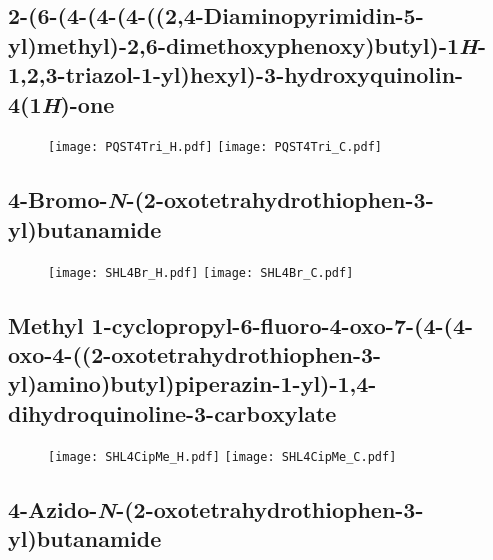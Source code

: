 \subsection{2-(6-(4-(4-(4-((2,4-Diaminopyrimidin-5-yl)methyl)-2,6-dimethoxyphenoxy)bu\allowbreak tyl)-1\textit{H}-1,2,3-triazol-1-yl)hexyl)-3-hydroxyquinolin-4(1\textit{H})-one }

\begin{figure}[H]
	\centering
		\texttt{[image: PQST4Tri\_H.pdf]}
		\texttt{[image: PQST4Tri\_C.pdf]}
\end{figure}


\subsection{4\hyp{}Bromo\hyp{}\textit{N}\hyp{}(2\hyp{}oxotetrahydrothiophen\hyp{}3\hyp{}yl)butanamide }

\begin{figure}[H]
	\centering
		\texttt{[image: SHL4Br\_H.pdf]}
		\texttt{[image: SHL4Br\_C.pdf]}
\end{figure}

\subsection{Methyl 1\hyp{}cyclopropyl\hyp{}6\hyp{}fluoro\hyp{}4\hyp{}oxo\hyp{}7\hyp{}(4\hyp{}(4\hyp{}oxo\hyp{}4\hyp{}((2\hyp{}oxotetrahydrothiophen\hyp{}3\hyp{}yl)amino)butyl)pip\allowbreak erazin\hyp{}1\hyp{}yl)\hyp{}1,4\hyp{}dihydroquinoline\hyp{}3\hyp{}carboxylate }

\begin{figure}[H]
	\centering
		\texttt{[image: SHL4CipMe\_H.pdf]}
		\texttt{[image: SHL4CipMe\_C.pdf]}
\end{figure}

\subsection{4\hyp{}Azido\hyp{}\textit{N}\hyp{}(2\hyp{}oxotetrahydrothiophen\hyp{}3\hyp{}yl)butanamide }

